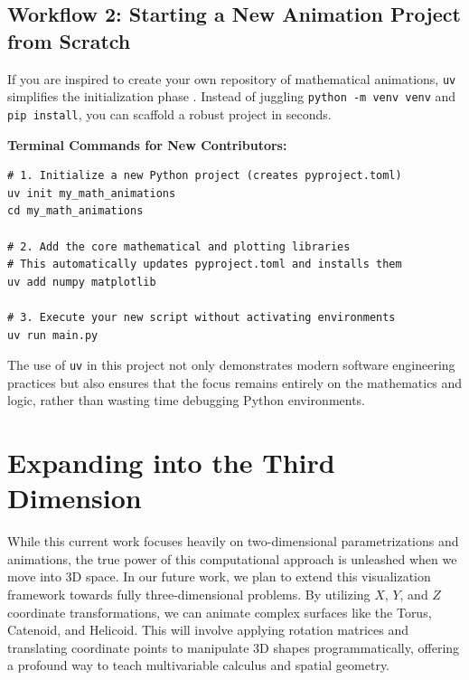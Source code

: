 \documentclass[12pt, a4paper]{report}
\begin{document}
\subsection{Workflow 2: Starting a New Animation Project from Scratch}
If you are inspired to create your own repository of mathematical animations, \texttt{uv} simplifies the initialization phase \cite{uv_docs}. Instead of juggling \texttt{python -m venv venv} and \texttt{pip install}, you can scaffold a robust project in seconds.

\vspace{0.2cm}
\begin{mdframed}[backgroundcolor=gray!10, linecolor=black, linewidth=1pt, roundcorner=5pt]
    \textbf{Terminal Commands for New Contributors:}
    \vspace{0.1cm}
    \begin{verbatim}
# 1. Initialize a new Python project (creates pyproject.toml)
uv init my_math_animations
cd my_math_animations

# 2. Add the core mathematical and plotting libraries
# This automatically updates pyproject.toml and installs them
uv add numpy matplotlib

# 3. Execute your new script without activating environments
uv run main.py
    \end{verbatim}
\end{mdframed}
\vspace{0.3cm}

The use of \texttt{uv} in this project not only demonstrates modern software engineering practices but also ensures that the focus remains entirely on the mathematics and logic, rather than wasting time debugging Python environments.

\newpage
\section{Expanding into the Third Dimension}
While this current work focuses heavily on two-dimensional parametrizations and animations, the true power of this computational approach is unleashed when we move into 3D space. In our future work, we plan to extend this visualization framework towards fully three-dimensional problems. By utilizing $X$, $Y$, and $Z$ coordinate transformations, we can animate complex surfaces like the Torus, Catenoid, and Helicoid. This will involve applying rotation matrices and translating coordinate points to manipulate 3D shapes programmatically, offering a profound way to teach multivariable calculus and spatial geometry.
\end{document}
